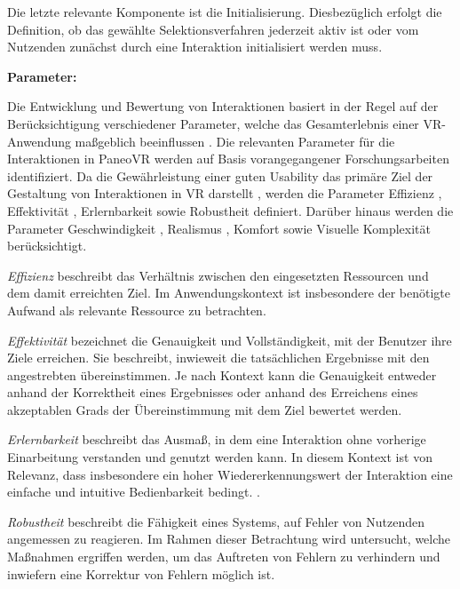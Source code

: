 Die letzte relevante Komponente ist die Initialisierung. Diesbezüglich erfolgt die Definition, ob das gewählte Selektionsverfahren jederzeit aktiv ist oder vom Nutzenden zunächst durch eine Interaktion initialisiert werden muss. 

{\normalfont \bfseries Parameter:} 

Die Entwicklung und Bewertung von Interaktionen basiert in der Regel auf der Berücksichtigung verschiedener Parameter, welche das Gesamterlebnis einer VR-Anwendung maßgeblich beeinflussen \citep{10.1145/3441852.3471230}. Die relevanten Parameter für die Interaktionen in PaneoVR werden auf Basis vorangegangener Forschungsarbeiten identifiziert. Da die Gewährleistung einer guten Usability das primäre Ziel der Gestaltung von Interaktionen in VR darstellt \citep{dorner_virtual_2019}, werden die Parameter Effizienz \citep{noauthor_din_nodate-1}, Effektivität \citep{noauthor_din_nodate-1}, Erlernbarkeit \citep{noauthor_din_nodate} sowie Robustheit \citep{noauthor_din_nodate} definiert. Darüber hinaus werden die Parameter Geschwindigkeit \citep{cook_chapter_2015}, Realismus \citep{jerald_vr_2015}, Komfort \citep{jerald_vr_2015} sowie Visuelle Komplexität \citep{steriadis_designing_2003} berücksichtigt. 

\textit{Effizienz} beschreibt das Verhältnis zwischen den eingesetzten Ressourcen und dem damit erreichten Ziel. Im Anwendungskontext ist  insbesondere der benötigte Aufwand als relevante Ressource zu betrachten.

\textit{Effektivität} bezeichnet die Genauigkeit und Vollständigkeit, mit der Benutzer ihre Ziele erreichen. Sie beschreibt, inwieweit die tatsächlichen Ergebnisse mit den angestrebten übereinstimmen. Je nach Kontext kann die Genauigkeit entweder anhand der Korrektheit eines Ergebnisses oder anhand des Erreichens eines akzeptablen Grads der Übereinstimmung mit dem Ziel bewertet werden.

\textit{Erlernbarkeit} beschreibt das Ausmaß, in dem eine Interaktion ohne vorherige Einarbeitung verstanden und genutzt werden kann. In diesem Kontext ist von Relevanz, dass insbesondere ein hoher Wiedererkennungswert der Interaktion eine einfache und intuitive Bedienbarkeit bedingt. \citep{jerald_vr_2015}.

\textit{Robustheit} beschreibt die Fähigkeit eines Systems, auf Fehler von Nutzenden angemessen zu reagieren. Im Rahmen dieser Betrachtung wird untersucht, welche Maßnahmen ergriffen werden, um das Auftreten von Fehlern zu verhindern und inwiefern eine Korrektur von Fehlern möglich ist.

